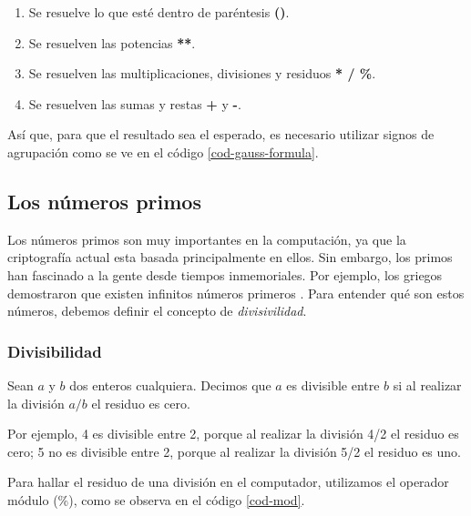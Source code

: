 	\begin{enumerate}
	\item Se resuelve lo que esté dentro de paréntesis \textbf{()}.
	\item Se resuelven las potencias \textbf{**}.
	\item Se resuelven las multiplicaciones, divisiones y residuos  \textbf{* / \%}. 
	\item Se resuelven las sumas y restas  \textbf{+} y \textbf{-}.
	\end{enumerate}
	
Así que, para que el resultado sea el esperado, es necesario utilizar signos de agrupación como se ve en el código \ref{cod-gauss-formula}. \\




\subsection{Los números primos}

Los números primos son muy importantes en la computación, ya que la criptografía actual esta basada principalmente en ellos. Sin embargo, los primos han fascinado a la gente desde tiempos inmemoriales. Por ejemplo, los griegos demostraron que existen infinitos números primeros \cite{discretemath}. Para entender qué son estos números, debemos definir el concepto de \emph{divisivilidad}.

\subsubsection{Divisibilidad}

Sean $a$ y $b$ dos enteros cualquiera. Decimos que $a$ es divisible entre $b$ si al realizar la división $a/b$ el residuo es cero.

Por ejemplo, 4 es divisible entre 2, porque al realizar la división 4/2 el residuo es cero; 5 no es divisible entre 2, porque al realizar la división 5/2 el residuo es uno.

Para hallar el residuo de una división en el computador, utilizamos el operador módulo (\%), como se observa en el código \ref{cod-mod}. \\





